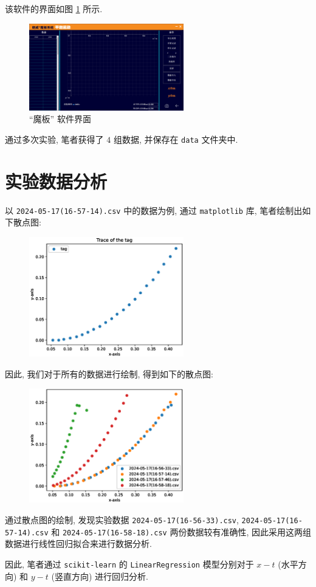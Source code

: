 \documentclass{article}
\begin{document}
该软件的界面如图 \ref{fig:software} 所示.

\begin{figure}[H]
    \centering
    \includegraphics[width=0.6\textwidth]{figures/magic-board.png}
    \caption{``魔板'' 软件界面}
    \label{fig:software}
\end{figure}

通过多次实验, 笔者获得了 $4$ 组数据, 并保存在 \texttt{data} 文件夹中.

\section{实验数据分析}

以 \texttt{2024-05-17(16-57-14).csv} 中的数据为例, 通过 \texttt{matplotlib} 库, 笔者绘制出如下散点图:

\begin{figure}[H]
    \centering
    \includegraphics[width=0.6\textwidth]{figures/plot1.eps}
\end{figure}

因此, 我们对于所有的数据进行绘制, 得到如下的散点图:

\begin{figure}[H]
    \centering
    \includegraphics[width=0.6\textwidth]{figures/plot-all.eps}
\end{figure}

通过散点图的绘制, 发现实验数据 \texttt{2024-05-17(16-56-33).csv}, \texttt{2024-05-17(16-57-14).csv} 和 \texttt{2024-05-17(16-58-18).csv} 两份数据较有准确性, 因此采用这两组数据进行线性回归拟合来进行数据分析.

因此, 笔者通过 \texttt{scikit-learn} 的 \texttt{LinearRegression} 模型分别对于 $x - t$ (水平方向) 和 $y - t$ (竖直方向) 进行回归分析.
\end{document}
